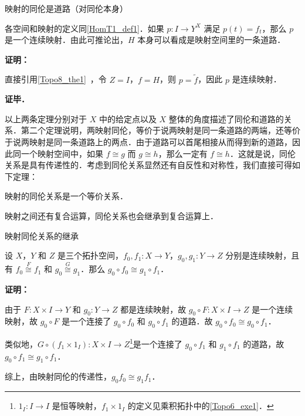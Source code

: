 \begin{theorem}{映射的同伦是道路（对同伦本身）}\label{HomT1_the1}

各空间和映射的定义同\autoref{HomT1_def1}．如果 $p:I\rightarrow Y^X$ 满足 $p(t)=f_t$，那么 $p$ 是一个连续映射．由此可推论出，$H$ 本身可以看成是映射空间里的一条道路．

\end{theorem}

\textbf{证明：}

直接引用\autoref{Topo8_the1}~，令 $Z=I$，$f=H$，则 $p=\widetilde{f}$，因此 $p$ 是连续映射．

\textbf{证毕．}

以上两条定理分别对于 $X$ 中的给定点以及 $X$ 整体的角度描述了同伦和道路的关系．第二个定理说明，两映射同伦，等价于说两映射是同一条道路的两端，还等价于说两映射是同一条道路上的两点．由于道路可以首尾相接从而得到新的道路，因此同一个映射空间中，如果 $f\cong g$ 而 $g\cong h$，那么一定有 $f\cong h$．这就是说，同伦关系是具有传递性的．考虑到同伦关系显然还有自反性和对称性，我们直接可得如下定理：

\begin{theorem}{}
映射的同伦关系是一个等价关系．
\end{theorem}

映射之间还有复合运算，同伦关系也会继承到复合运算上．

\begin{theorem}{映射同伦关系的继承}\label{HomT1_the2}

设 $X$，$Y$ 和 $Z$ 是三个拓扑空间，$f_0, f_1:X\rightarrow Y$，$g_0, g_1:Y\rightarrow Z$ 分别是连续映射，且有 $f_0\overset{F}{\cong}f_1$ 和 $g_0\overset{G}{\cong}g_1$．那么 $g_0\circ f_0\cong g_1\circ f_1$．

\end{theorem}

\textbf{证明：}

由于 $F:X\times I\rightarrow Y$ 和 $g_0:Y\rightarrow Z$ 都是连续映射，故 $g_0\circ F:X\times I\rightarrow Z$ 是一个连续映射，故 $g_0\circ F$ 是一个连接了 $g_0\circ f_0$ 和 $g_0\circ f_1$ 的道路．故 $g_0\circ f_0\cong g_0\circ f_1$．

类似地，$G\circ(f_1\times 1_I):X\times I\rightarrow Z$\footnote{$1_I:I\rightarrow I$ 是恒等映射，$f_1\times 1_I$ 的定义见乘积拓扑中的\autoref{Topo6_exe1}．}是一个连接了 $g_0\circ f_1$ 和 $g_1\circ f_1$ 的道路，故 $g_0\circ f_1\cong g_1\circ f_1$．

综上，由映射同伦的传递性，$g_0f_0\cong g_1f_1$．

